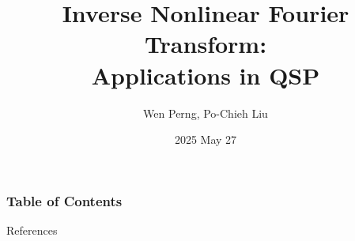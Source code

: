 \documentclass{slides}
\title[below title]{\textbf{Inverse Nonlinear Fourier Transform:\\Applications in QSP}}
\author{Wen Perng, Po-Chieh Liu}
\institute[NTU]{Special Topics in Quantum Information Science}
\date{2025 May 27}
\begin{document}
\maketitleframe

% 
\begin{frame}
    \frametitle{Table of Contents}
    \tableofcontents[sectionstyle=show,subsectionstyle=hide]
\end{frame}





\begin{frame}[allowframebreaks]{References}
    \nocite{*}
    \printbibliography
\end{frame}
\end{document}
